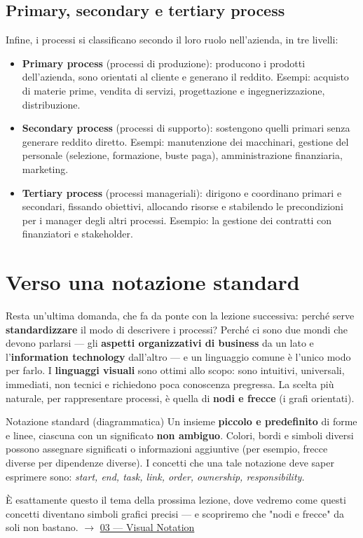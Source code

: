 \subsection{\texorpdfstring{Primary, secondary e tertiary process}{Primary, secondary e tertiary process}}

Infine, i processi si classificano secondo il loro ruolo nell'azienda, in tre livelli:

\begin{itemize}
\item \textbf{Primary process} (processi di produzione): producono i prodotti dell'azienda, sono orientati al cliente e generano il reddito. Esempi: acquisto di materie prime, vendita di servizi, progettazione e ingegnerizzazione, distribuzione.
\item \textbf{Secondary process} (processi di supporto): sostengono quelli primari senza generare reddito diretto. Esempi: manutenzione dei macchinari, gestione del personale (selezione, formazione, buste paga), amministrazione finanziaria, marketing.
\item \textbf{Tertiary process} (processi manageriali): dirigono e coordinano primari e secondari, fissando obiettivi, allocando risorse e stabilendo le precondizioni per i manager degli altri processi. Esempio: la gestione dei contratti con finanziatori e stakeholder.
\end{itemize}

\section{\texorpdfstring{Verso una notazione standard}{Verso una notazione standard}}

Resta un'ultima domanda, che fa da ponte con la lezione successiva: perché serve \textbf{standardizzare} il modo di descrivere i processi? Perché ci sono due mondi che devono parlarsi — gli \textbf{aspetti organizzativi di business} da un lato e l'\textbf{information technology} dall'altro — e un linguaggio comune è l'unico modo per farlo. I \textbf{linguaggi visuali} sono ottimi allo scopo: sono intuitivi, universali, immediati, non tecnici e richiedono poca conoscenza pregressa. La scelta più naturale, per rappresentare processi, è quella di \textbf{nodi e frecce} (i grafi orientati).

\begin{boxdefinition}{Notazione standard (diagrammatica)}
Un insieme \textbf{piccolo e predefinito} di forme e linee, ciascuna con un significato \textbf{non ambiguo}. Colori, bordi e simboli diversi possono assegnare significati o informazioni aggiuntive (per esempio, frecce diverse per dipendenze diverse). I concetti che una tale notazione deve saper esprimere sono: \emph{start, end, task, link, order, ownership, responsibility.}
\end{boxdefinition}

È esattamente questo il tema della prossima lezione, dove vedremo come questi concetti diventano simboli grafici precisi — e scopriremo che "nodi e frecce" da soli non bastano. $\rightarrow$ \hyperref[ch:03]{03 — Visual Notation}